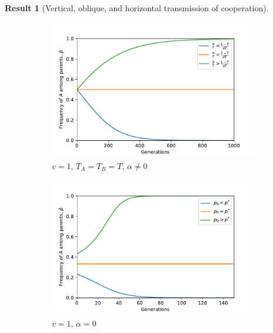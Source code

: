 \documentclass[12pt]{extarticle}
\newtheorem{result}{Result}
\begin{document}
{\begin{result}[Vertical, oblique, and horizontal transmission of cooperation]
\begin{enumerate}
\end{enumerate}
\end{result}



\begin{figure}[H]
  \centering
  \begin{subfigure}{8cm}
    \includegraphics[scale=0.5]{figure3a.pdf}
    \caption{$v=1$, $T_A=T_B=T$, $\alpha \neq 0$}
    \label{fig:results_a}
  \end{subfigure}
  \begin{subfigure}{8cm}
    \includegraphics[scale=0.5]{figure3b.pdf}
    \caption{$v=1$, $\alpha = 0$}
    \label{fig:results_b}
  \end{subfigure}
  \begin{subfigure}{8cm}

\end{subfigure}
\end{figure}}
\end{document}
